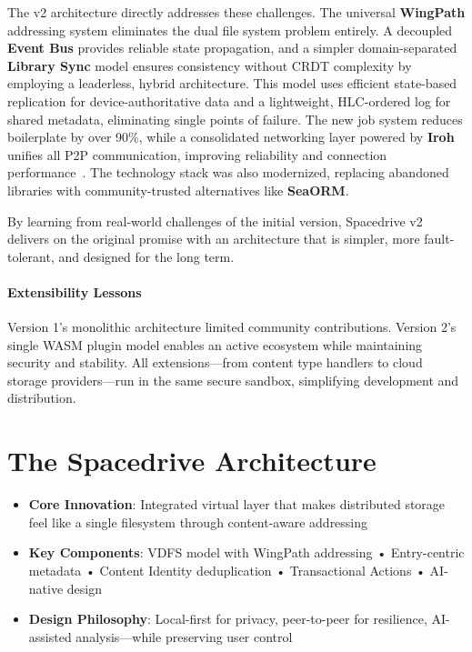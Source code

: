 \documentclass[sigconf]{acmart}
\begin{document}
The v2 architecture directly addresses these challenges. The universal \textbf{WingPath} addressing system eliminates the dual file system problem entirely. A decoupled \textbf{Event Bus} provides reliable state propagation, and a simpler domain-separated \textbf{Library Sync} model ensures consistency without CRDT complexity by employing a leaderless, hybrid architecture. This model uses efficient state-based replication for device-authoritative data and a lightweight, HLC-ordered log for shared metadata, eliminating single points of failure. The new job system reduces boilerplate by over 90\%, while a consolidated networking layer powered by \textbf{Iroh} unifies all P2P communication, improving reliability and connection performance~\cite{iroh_networking}. The technology stack was also modernized, replacing abandoned libraries with community-trusted alternatives like \textbf{SeaORM}.

By learning from real-world challenges of the initial version, Spacedrive v2 delivers on the original promise with an architecture that is simpler, more fault-tolerant, and designed for the long term.

\paragraph{Extensibility Lessons}
Version 1's monolithic architecture limited community contributions. Version 2's single WASM plugin model enables an active ecosystem while maintaining security and stability. All extensions—from content type handlers to cloud storage providers—run in the same secure sandbox, simplifying development and distribution.


\section{The Spacedrive Architecture}
\label{sec:architecture}

\begin{keytakeaways}
\begin{itemize}[noitemsep, topsep=0pt]
\item \textbf{Core Innovation}: Integrated virtual layer that makes distributed storage feel like a single filesystem through content-aware addressing
\item \textbf{Key Components}: VDFS model with WingPath addressing • Entry-centric metadata • Content Identity deduplication • Transactional Actions • AI-native design
\item \textbf{Design Philosophy}: Local-first for privacy, peer-to-peer for resilience, AI-assisted analysis---while preserving user control
\end{itemize}
\end{keytakeaways}
\end{document}
